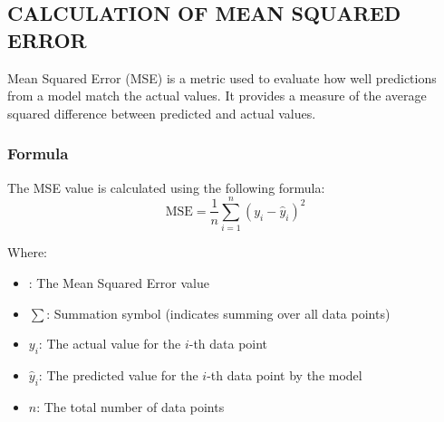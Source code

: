 \subsection{CALCULATION OF MEAN SQUARED ERROR}
Mean Squared Error (MSE) is a metric used to evaluate how well predictions from a model match the actual values. It provides a measure of the average squared difference between predicted and actual values.

\subsubsection{Formula}
The MSE value is calculated using the following formula:
\begin{equation*}
    \text{MSE} = \frac{1}{n} \sum_{i=1}^{n} (y_i - \hat{y}_i)^2
\end{equation*}

Where:
\begin{itemize}
    \item {}: The Mean Squared Error value
    \item $\sum$: Summation symbol (indicates summing over all data points)
    \item $y_i$: The actual value for the $i$-th data point
    \item $\hat{y}_i$: The predicted value for the $i$-th data point by the model
    \item $n$: The total number of data points
\end{itemize}

